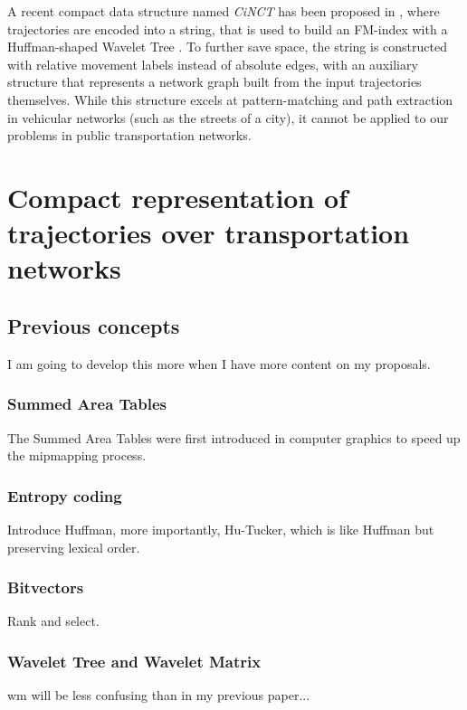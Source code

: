 \documentclass[a4paper,10pt,twoside]{book}
\begin{document}
    
    A recent compact data structure named {\em CiNCT} has been proposed in \cite{koide2018cinct}, where trajectories are encoded into a string, that is used to build an FM-index \cite{DBLP:conf/focs/FerraginaM00} with a Huffman-shaped Wavelet Tree \cite{ferragina2009compressed}. To further save space, the string is constructed with relative movement labels instead of absolute edges, with an auxiliary structure that represents a network graph built from the input trajectories themselves. While this structure excels at pattern-matching and path extraction in vehicular networks (such as the streets of a city), it cannot be applied to our problems in public transportation networks.
	
	
\part{Compact representation of trajectories over transportation networks}
\chapter{Previous concepts}
	I am going to develop this more when I have more content on my proposals.
	
	\section{Summed Area Tables}
	The Summed Area Tables were first introduced in computer graphics \cite{crow1984summed} to speed up the mipmapping process.
	
	\section{Entropy coding}
	Introduce Huffman, more importantly, Hu-Tucker, which is like Huffman but preserving lexical order.
	
	\section{Bitvectors}
	Rank and select.
	
	\section{Wavelet Tree and Wavelet Matrix}
	\label{sec:wt}
	\gls{wm} will be less confusing than in my previous paper...
	
\end{document}
